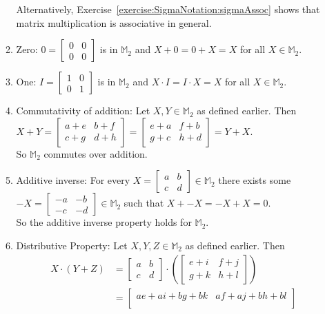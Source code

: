 \begin{enumerate}[(a)]
\begin{enumerate}[(1)]
Alternatively, Exercise~\ref{exercise:SigmaNotation:sigmaAssoc} shows that matrix multiplication is associative in general.
\item Zero:  $0=
\begin{bmatrix}
0 & 0\\
0 & 0
\end{bmatrix}$
is in ${\mathbb M}_2$ and $X+0=0+X=X$ for all $X\in{\mathbb M}_2$. 
\item One:  $I=
\begin{bmatrix}
1 & 0\\
0 & 1
\end{bmatrix}$
is in ${\mathbb M}_2$ and $X\cdot I=I\cdot X=X$ for all $X\in{\mathbb M}_2$.
\item Commutativity of addition:  Let $X,Y\in{\mathbb M}_2$ as defined earlier.  Then $X+Y=
\begin{bmatrix}
a+e & b+f\\
c+g & d+h
\end{bmatrix}=
\begin{bmatrix}
e+a & f+b\\
g+c & h+d
\end{bmatrix}
=Y+X$.\\  
So ${\mathbb M}_2$ commutes over addition.
\item Additive inverse:  For every $X=
\begin{bmatrix}
a & b\\
c & d
\end{bmatrix}
\in{\mathbb M}_2$ there exists some $-X=
\begin{bmatrix}
-a & -b\\
-c & -d
\end{bmatrix}
\in{\mathbb M}_2$ such that $X+-X=-X+X=0$.\\  
So the additive inverse property holds for ${\mathbb M}_2$.
\item Distributive Property:  Let $X,Y,Z\in{\mathbb M}_2$ as defined earlier.  Then 
\begin{align*}
X\cdot(Y+Z)&=
\begin{bmatrix}
a & b\\
c & d
\end{bmatrix}
\cdot\left(
\begin{bmatrix}
e+i & f+j\\
g+k & h+l
\end{bmatrix}
\right)\\
&=
\begin{bmatrix}
ae+ai+bg+bk & af+aj+bh+bl\\

\end{bmatrix}
\end{align*}
\end{enumerate}
\end{enumerate}

